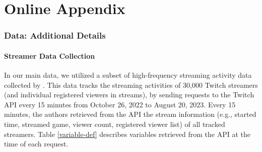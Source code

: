 \documentclass[a4paper,12pt]{article}
\renewcommand \thepart{}
\renewcommand \partname{}
\begin{document}
\newpage
\appendix
\renewcommand \thepart{}
\renewcommand \partname{}
\part{Online Appendix} %
\parttoc %

\renewcommand{\thesection}{\Alph{section}}
\renewcommand{\thesubsection}{\Alph{section}.\arabic{subsection}}

\renewcommand{\thealgorithm}{\thesubsection.\arabic{algorithm}}

\newpage

\section{Data: Additional Details}\label{data}
\subsection{Streamer Data Collection} \label{data-collection}
In our main data, we utilized a subset of high-frequency streaming activity data collected by \cite{yangwiptwitch}. This data tracks the streaming activities of 30,000 Twitch streamers (and individual registered viewers in streams), by sending requests to the Twitch API every 15 minutes from October 26, 2022 to August 20, 2023. Every 15 minutes, the authors retrieved from the API the stream information (e.g., started time, streamed game, viewer count, registered viewer list) of all tracked streamers. Table \ref{variable-def} describes variables retrieved from the API at the time of each request. 
\end{document}
